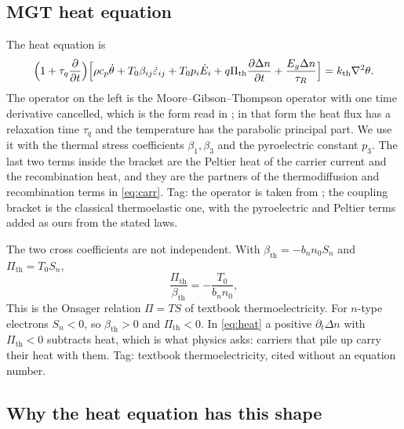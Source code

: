 \documentclass[11pt,a4paper]{article}
\newcommand{\eps}{\varepsilon}
\newcommand{\bth}{\beta_{\mathrm{th}}}
\newcommand{\Pth}{\Pi_{\mathrm{th}}}
\newcommand{\kB}{k_{\mathrm{th}}}
\begin{document}
\subsection{MGT heat equation}

The heat equation is
\begin{equation}\label{eq:heat}
\Bigl(1+\tau_q\frac{\partial}{\partial t}\Bigr)
\Bigl[\rho c_p\dot\theta+T_0\beta_{ij}\dot\eps_{ij}+T_0p_i\dot E_i
+q\Pth\frac{\partial\Delta n}{\partial t}+\frac{E_g\Delta n}{\tau_R}\Bigr]
=\kB\nabla^2\theta .
\end{equation}
The operator on the left is the Moore--Gibson--Thompson operator with one
time derivative cancelled, which is the form read in \cite[Eqs.~(2.5) and (3.1)--(3.5)]{Quintanilla2019}; in
that form the heat flux has a relaxation time $\tau_q$ and the temperature has the parabolic principal part.
We use it with the thermal stress coefficients $\beta_1,\beta_3$ and the pyroelectric constant $p_3$. The
last two terms inside the bracket are the Peltier heat of the carrier current and the recombination heat,
and they are the partners of the thermodiffusion and recombination terms in \eqref{eq:carr}.
Tag: the operator is taken from \cite{Quintanilla2019}; the coupling bracket is the classical
thermoelastic one, with the pyroelectric and Peltier terms added as ours from the stated laws.

The two cross coefficients are not independent. With $\bth=-b_nn_0S_n$ and $\Pth=T_0S_n$,
\begin{equation}\label{eq:onsager}
\frac{\Pth}{\bth}=-\frac{T_0}{b_nn_0},
\end{equation}
This is the Onsager relation $\Pi=TS$ of textbook thermoelectricity. For
$n$-type electrons $S_n<0$, so $\bth>0$ and $\Pth<0$. In \eqref{eq:heat} a positive
$\partial_t\Delta n$ with $\Pth<0$ subtracts heat, which is what physics asks: carriers that pile up carry
their heat with them. 
Tag: textbook thermoelectricity, cited without an equation number.

\subsection{Why the heat equation has this shape}
\end{document}
